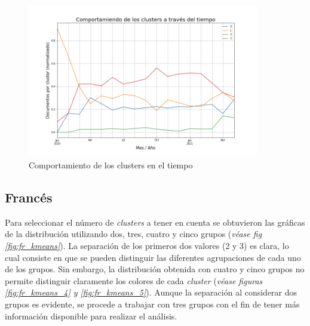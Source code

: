 \begin{figure}
    \centering
    \includegraphics[width=0.9\textwidth]{results/TopicDetection/es/cluster_over_time.png}
    \caption{Comportamiento de los clusters en el tiempo}
    \label{fig:es_time}
\end{figure}

\subsection{Francés}
Para seleccionar el número de \textit{clusters} a tener en cuenta se obtuvieron las gráficas de la distribución utilizando dos, tres, cuatro y cinco grupos (\textit{véase fig \ref{fig:fr_kmeans}}). La separación de los primeros dos valores (2 y 3) es clara, lo cual consiste en que se pueden distinguir las diferentes agrupaciones de cada uno de los grupos. Sin embargo, la distribución obtenida con cuatro y cinco grupos no permite distinguir claramente los colores de cada \textit{cluster} (\textit{véase figuras  \ref{fig:fr_kmeans_4} y \ref{fig:fr_kmeans_5}}). Aunque la separación al considerar dos grupos es evidente, se procede a trabajar con tres grupos con el fin de tener más información disponible para realizar el análisis.

